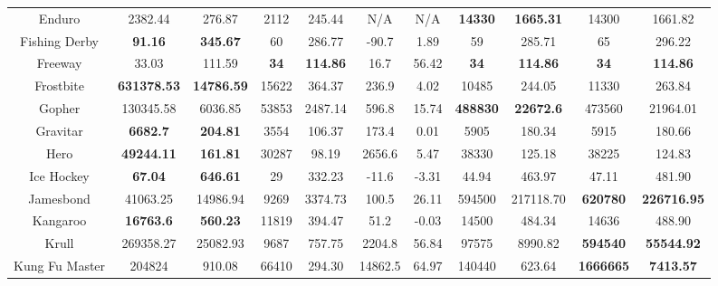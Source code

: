 \documentclass[nohyperref]{article}
\newcommand{\best}[1]{\textbf{#1}}
\theoremstyle{plain}
\begin{document}
\begin{table}[!hb]
\begin{center}
\begin{tabular}{|c |c c| c c| c c| c c| c c|}
 Enduro             & 2382.44               & 276.87       & 2112     &245.44      & N/A      & N/A     & \best{14330}       & \best{1665.31}                 &14300             &1661.82\\
 Fishing Derby      & \textbf{91.16}          & \textbf{345.67     }  & 60        &286.77      &-90.7     & 1.89    & 59          & 285.71                    &65               &296.22\\
 Freeway            & 33.03                 & 111.59       & \textbf{34}        &\textbf{114.86}      &16.7      & 56.42   & \best{34}      & \best{114.86 }  &\textbf{34}      &\textbf{114.86}\\
 Frostbite          & \textbf{631378.53}      & \textbf{14786.59}     & 15622    &364.37      &236.9     & 4.02    & 10485       & 244.05                     &11330	            &263.84\\
 Gopher             & 130345.58             & 6036.85      & 53853    &2487.14     &596.8     & 15.74   & \best{488830}      & \best{22672.6}                 &473560           &21964.01\\
 Gravitar           & \textbf{6682.7     }    & \textbf{204.81     }  & 3554     &106.37      &173.4     & 0.01    & 5905        & 180.34                     &5915             &180.66\\
 Hero               & \textbf{49244.11}       & \textbf{161.81     }  & 30287    &98.19       &2656.6    & 5.47    & 38330       & 125.18                     &38225	            &124.83\\
 Ice Hockey         & \textbf{67.04      }    & \textbf{646.61     }  & 29        &332.23      &-11.6     & -3.31   & 44.94       & 463.97                    &47.11           &481.90\\
 Jamesbond          & 41063.25              & 14986.94     &  9269     &3374.73     &100.5     & 26.11   & 594500      & 217118.70              &\textbf{620780	}  &\textbf{226716.95}\\
 Kangaroo           & \textbf{16763.6        }& \textbf{560.23     }  & 11819     &394.47      &51.2      & -0.03   & 14500       & 484.34                    &14636           &488.90\\
 Krull              & 269358.27      & 25082.93     & 9687     &757.75      &2204.8    & 56.84   & 97575       & 8990.82                    &\textbf{594540}          &\textbf{55544.92}\\
 Kung Fu Master     & 204824         & 910.08       & 66410    &294.30      &14862.5   & 64.97   & 140440      & 623.64                     &\textbf{1666665}	          &\textbf{7413.57}\\

\end{tabular}
\end{center}
\end{table}
\end{document}
